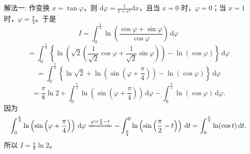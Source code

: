 \documentclass[../../main.tex]{subfiles}
\begin{document}
\begin{solution}
{\color{blue}解法一:}
作变换 \( x = \tan \varphi \)，则 \( \text{d}\varphi = \frac{1}{1 + x^2} \text{d}x \)，且当 \( x = 0 \) 时，\( \varphi = 0 \)；当 \( x = 1 \) 时，\( \varphi = \frac{\pi}{4} \)。于是
\[
I = \int_{0}^{\frac{\pi}{4}} \ln \left( \frac{\cos \varphi + \sin \varphi}{\cos \varphi} \right) \, \text{d}\varphi
\]
\[
= \int_{0}^{\frac{\pi}{4}} \left\{ \ln \left( \sqrt{2} \left( \frac{1}{\sqrt{2}} \cos \varphi + \frac{1}{\sqrt{2}} \sin \varphi \right) \right) - \ln(\cos \varphi) \right\} \, \text{d}\varphi
\]
\[
= \int_{0}^{\frac{\pi}{4}} \left\{ \ln \sqrt{2} + \ln \left( \sin \left( \varphi + \frac{\pi}{4} \right) \right) - \ln(\cos \varphi) \right\} \, \text{d}\varphi
\]
\[
= \frac{\pi}{8} \ln 2 + \int_{0}^{\frac{\pi}{4}} \ln \left( \sin \left( \varphi + \frac{\pi}{4} \right) \right) \, \text{d}\varphi - \int_{0}^{\frac{\pi}{4}} \ln(\cos \varphi) \, \text{d}\varphi.
\]
因为
\[
\int_{0}^{\frac{\pi}{4}} \ln \left( \sin \left( \varphi + \frac{\pi}{4} \right) \right) \, \text{d}\varphi \xlongequal{\varphi = \frac{\pi}{4} - t} - \int_{\frac{\pi}{4}}^{0} \ln \left( \sin \left( \frac{\pi}{2} - t \right) \right) \, \text{d}t = \int_{0}^{\frac{\pi}{4}} \ln(\cos t) \, \text{d}t,
\]
所以 \( I = \frac{\pi}{8} \ln 2 \)。


\end{solution}
\end{document}
